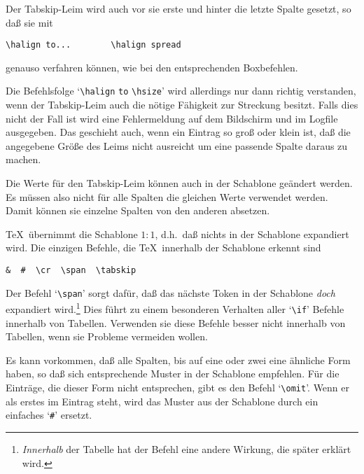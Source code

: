 Der 
Tabskip-Leim wird auch vor sie erste und hinter die letzte Spalte
gesetzt, so da\ss{} sie mit
\begin{verbatim}
\halign to...        \halign spread
\end{verbatim}
genauso verfahren k\"onnen, wie bei den entsprechenden Boxbefehlen.

Die Befehlsfolge
`\verb|\halign| \verb|to| \verb|\hsize|' wird
allerdings nur dann richtig verstanden, wenn der Tabskip-Leim auch die
n\"otige F\"ahigkeit zur Streckung besitzt. Falls dies nicht der Fall ist
wird eine Fehlermeldung auf dem 
Bildschirm und im Logfile ausgegeben.
Das geschieht auch, wenn ein Eintrag so gro\ss{} oder klein ist, da\ss{} die
angegebene 
Gr\"o\ss{}e des Leims nicht ausreicht um eine passende Spalte
daraus zu machen.

Die Werte f\"ur den Tabskip-Leim k\"onnen auch in der 
Schablone ge\"andert
werden. Es m\"ussen also nicht f\"ur alle Spalten die gleichen Werte
verwendet werden. Damit k\"onnen sie einzelne Spalten von den anderen
absetzen.

\TeX\ \"ubernimmt die 
Schablone $1:1$, d.h.\ da\ss{} nichts in der Schablone
expandiert wird. Die einzigen Befehle, die \TeX\ innerhalb der
Schablone erkennt sind
\begin{verbatim}
&  #  \cr  \span  \tabskip
\end{verbatim}
Der Befehl `\verb|\span|' sorgt daf\"ur, da\ss{} das n\"achste Token in der
Schablone {\em doch} expandiert wird.\footnote{{\em Innerhalb} der
Tabelle hat der Befehl eine andere Wirkung, die sp\"ater erkl\"art wird.}
Dies f\"uhrt zu einem besonderen Verhalten aller `\verb|\if|' Befehle
innerhalb von Tabellen. Verwenden sie diese Befehle besser nicht
innerhalb von Tabellen, wenn sie Probleme vermeiden wollen.

Es kann vorkommen, da\ss{} alle Spalten, bis auf eine oder zwei eine
\"ahnliche Form haben, so da\ss{} sich entsprechende Muster in der Schablone
empfehlen. F\"ur die Eintr\"age, die dieser Form nicht entsprechen, gibt
es den Befehl 
`\verb|\omit|'. Wenn er als erstes im Eintrag steht,
wird das Muster aus der Schablone durch ein einfaches `\verb|#|'
ersetzt.


